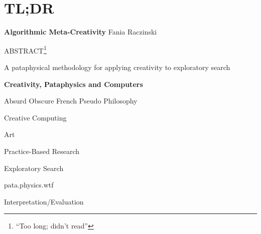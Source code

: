 
\pagestyle{empty}

\chapter{TL;DR}
\label{abstract}

{\Large \textbf{Algorithmic Meta-Creativity}}
Fania Raczinski

\vspace{0.5cm}
ABSTRACT\footnote{``Too long; didn't read''}

A pataphysical methodology for applying creativity to exploratory search

\vspace{1cm}

{\Large \textbf{Creativity, Pataphysics and Computers}}

Absurd Obscure French Pseudo Philosophy

Creative Computing

Art

Practice-Based Research

Exploratory Search

pata.physics.wtf

Interpretation/Evaluation

